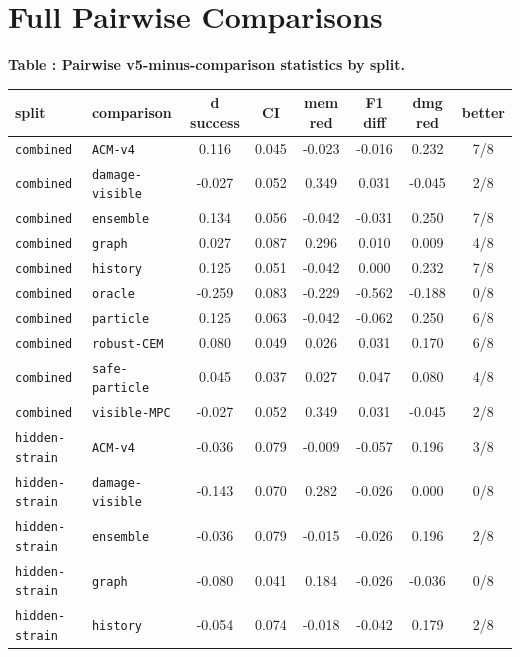 \documentclass{article}
\begin{document}
\section{Full Pairwise Comparisons}
\scriptsize
\setlength{\tabcolsep}{2pt}
\begin{center}
\label{tab:pairwise}\textbf{Table \thetable: Pairwise v5-minus-comparison statistics by split.}\\[0.4ex]
\begin{tabular}{llcccccc}
\toprule
split & comparison & d success & CI & mem red & F1 diff & dmg red & better \\
\midrule
\texttt{combined} & \texttt{ACM-v4} & 0.116 & 0.045 & -0.023 & -0.016 & 0.232 & 7/8 \\
\texttt{combined} & \texttt{damage-visible} & -0.027 & 0.052 & 0.349 & 0.031 & -0.045 & 2/8 \\
\texttt{combined} & \texttt{ensemble} & 0.134 & 0.056 & -0.042 & -0.031 & 0.250 & 7/8 \\
\texttt{combined} & \texttt{graph} & 0.027 & 0.087 & 0.296 & 0.010 & 0.009 & 4/8 \\
\texttt{combined} & \texttt{history} & 0.125 & 0.051 & -0.042 & 0.000 & 0.232 & 7/8 \\
\texttt{combined} & \texttt{oracle} & -0.259 & 0.083 & -0.229 & -0.562 & -0.188 & 0/8 \\
\texttt{combined} & \texttt{particle} & 0.125 & 0.063 & -0.042 & -0.062 & 0.250 & 6/8 \\
\texttt{combined} & \texttt{robust-CEM} & 0.080 & 0.049 & 0.026 & 0.031 & 0.170 & 6/8 \\
\texttt{combined} & \texttt{safe-particle} & 0.045 & 0.037 & 0.027 & 0.047 & 0.080 & 4/8 \\
\texttt{combined} & \texttt{visible-MPC} & -0.027 & 0.052 & 0.349 & 0.031 & -0.045 & 2/8 \\
\texttt{hidden-strain} & \texttt{ACM-v4} & -0.036 & 0.079 & -0.009 & -0.057 & 0.196 & 3/8 \\
\texttt{hidden-strain} & \texttt{damage-visible} & -0.143 & 0.070 & 0.282 & -0.026 & 0.000 & 0/8 \\
\texttt{hidden-strain} & \texttt{ensemble} & -0.036 & 0.079 & -0.015 & -0.026 & 0.196 & 2/8 \\
\texttt{hidden-strain} & \texttt{graph} & -0.080 & 0.041 & 0.184 & -0.026 & -0.036 & 0/8 \\
\texttt{hidden-strain} & \texttt{history} & -0.054 & 0.074 & -0.018 & -0.042 & 0.179 & 2/8 \\

\end{tabular}
\end{center}
\end{document}
